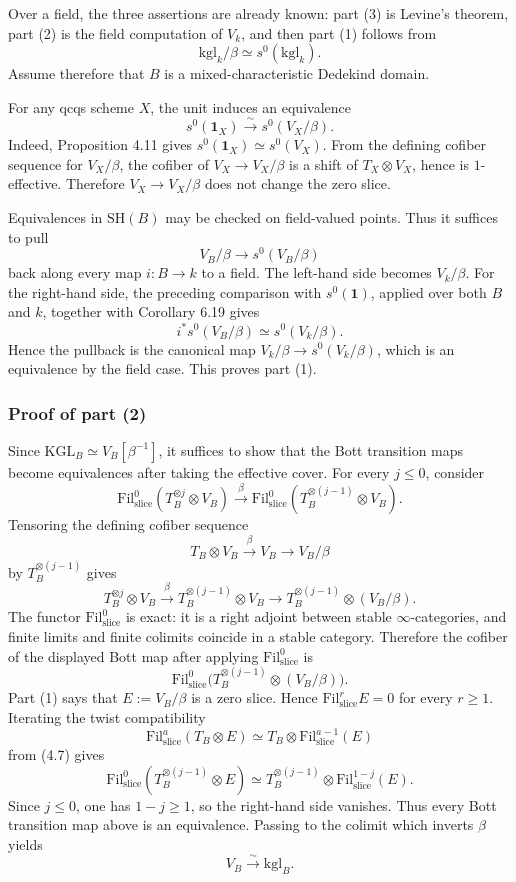 \documentclass[11pt,a4paper]{article}
\newcommand{\SH}{\mathrm{SH}}
\newcommand{\KGL}{\mathrm{KGL}}
\newcommand{\kgl}{\mathrm{kgl}}
\newcommand{\Fil}{\mathrm{Fil}}
\newcommand{\1}{\mathbf 1}
\newcommand{\slic}{\mathrm{slice}}
\theoremstyle{bemstyle}
\theoremstyle{definition}
\begin{document}
Over a field, the three assertions are already known: part (3) is Levine's theorem, part (2) is the field computation of \(V_k\), and then part (1) follows from
\[
       \kgl_k/\beta\simeq s^0(\kgl_k).
\]
Assume therefore that \(B\) is a mixed-characteristic Dedekind domain.

For any qcqs scheme \(X\), the unit induces an equivalence
\[
       s^0(\1_X)\xrightarrow{\sim}s^0(V_X/\beta).
\]
Indeed, Proposition 4.11 gives \(s^0(\1_X)\simeq s^0(V_X)\). From the defining cofiber sequence for \(V_X/\beta\), the cofiber of \(V_X\to V_X/\beta\) is a shift of \(T_X\otimes V_X\), hence is \(1\)-effective. Therefore \(V_X\to V_X/\beta\) does not change the zero slice.

Equivalences in \(\SH(B)\) may be checked on field-valued points. Thus it suffices to pull
\[
       V_B/\beta\longrightarrow s^0(V_B/\beta)
\]
back along every map \(i:B\to k\) to a field. The left-hand side becomes \(V_k/\beta\). For the right-hand side, the preceding comparison with \(s^0(\1)\), applied over both \(B\) and \(k\), together with Corollary 6.19 gives
\[
       i^*s^0(V_B/\beta)\simeq s^0(V_k/\beta).
\]
Hence the pullback is the canonical map \(V_k/\beta\to s^0(V_k/\beta)\), which is an equivalence by the field case. This proves part (1).

\subsubsection{Proof of part (2)}

Since \(\KGL_B\simeq V_B[\beta^{-1}]\), it suffices to show that the Bott transition maps become equivalences after taking the effective cover. For every \(j\leq0\), consider
\[
       \Fil^0_{\slic}(T_B^{\otimes j}\otimes V_B)
       \xrightarrow{\beta}
       \Fil^0_{\slic}(T_B^{\otimes(j-1)}\otimes V_B).
\]
Tensoring the defining cofiber sequence
\[
       T_B\otimes V_B\xrightarrow{\beta}V_B\longrightarrow V_B/\beta
\]
by \(T_B^{\otimes(j-1)}\) gives
\[
       T_B^{\otimes j}\otimes V_B
       \xrightarrow{\beta}
       T_B^{\otimes(j-1)}\otimes V_B
       \longrightarrow
       T_B^{\otimes(j-1)}\otimes(V_B/\beta).
\]
The functor \(\Fil^0_{\slic}\) is exact: it is a right adjoint between stable \(\infty\)-categories, and finite limits and finite colimits coincide in a stable category. Therefore the cofiber of the displayed Bott map after applying \(\Fil^0_{\slic}\) is
\[
       \Fil^0_{\slic}\bigl(T_B^{\otimes(j-1)}\otimes(V_B/\beta)\bigr).
\]
Part (1) says that \(E:=V_B/\beta\) is a zero slice. Hence \(\Fil^r_{\slic}E=0\) for every \(r\geq1\). Iterating the twist compatibility
\[
       \Fil^a_{\slic}(T_B\otimes E)
       \simeq T_B\otimes\Fil^{a-1}_{\slic}(E)
\]
from (4.7) gives
\[
       \Fil^0_{\slic}(T_B^{\otimes(j-1)}\otimes E)
       \simeq
       T_B^{\otimes(j-1)}\otimes\Fil^{1-j}_{\slic}(E).
\]
Since \(j\leq0\), one has \(1-j\geq1\), so the right-hand side vanishes. Thus every Bott transition map above is an equivalence. Passing to the colimit which inverts \(\beta\) yields
\[
       V_B\xrightarrow{\sim}\kgl_B.
\]
\end{document}
